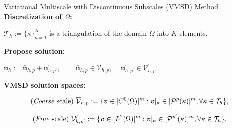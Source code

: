 \documentclass{beamer}
\newcounter{sectionframecount}
\begin{document}
\begin{frame}[t]{Variational Multiscale with Discontinuous Subscales (VMSD) Method}
  \textbf{Discretization of $\Omega$:}

  \vspace{5pt}
  $\mathcal{T}_h := \{\kappa\}_{\kappa = 1}^K$ is a triangulation of the domain $\Omega$ into $K$ elements.


  \vspace{10pt}
  \textbf{Propose solution:}

  $\boldsymbol{u}_h := \bar{\boldsymbol{u}}_{h,p} + \boldsymbol{u}_{h,p^\prime}^\prime$, ~~~~$\bar{\boldsymbol{u}}_{h,p} \in \overline{\mathcal{V}}_{h,p}$,~~ $\boldsymbol{u}^\prime_{h,p^\prime} \in \mathcal{V}^\prime_{h,p^\prime}$.

  \vspace{10pt}
  \textbf{VMSD solution spaces:}

  \vspace{-15pt}
  \begin{equation}
    \text{(\textit{Coarse} scale) } \overline{\mathcal{V}}_{h,p} := \{\boldsymbol{v}\in [C^0(\Omega)]^m : \boldsymbol{v}|_\kappa \in [\mathcal{P}^p(\kappa)]^m, \forall \kappa \in \mathcal{T}_h\},
  \end{equation}

  \vspace{-15pt}
  \begin{equation}
    \text{(\textit{Fine} scale) } \mathcal{V}^\prime_{h,p^\prime} := \{\boldsymbol{v}\in [L^2(\Omega)]^m : \boldsymbol{v}|_\kappa \in [\mathcal{P}^{p^\prime}(\kappa)]^m, \forall \kappa \in \mathcal{T}_h\}.
  \end{equation}

\end{frame}

\end{document}

